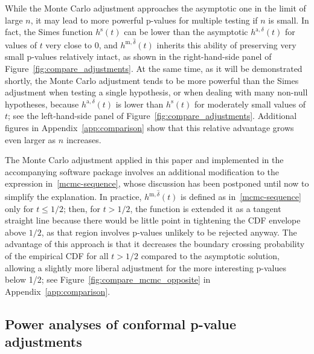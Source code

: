 \documentclass[11pt]{article}
\begin{document}
While the Monte Carlo adjustment approaches the asymptotic one in the limit of large $n$, it may lead to more powerful p-values for multiple testing if $n$ is small. In fact, the Simes function $h^{\mathrm{s}}(t)$ can be lower than the asymptotic $h^{\mathrm{a},\delta}(t)$ for values of $t$ very close to 0, and $h^{\mathrm{m},\hat{\delta}}(t)$ inherits this ability of preserving very small p-values relatively intact, as shown in the right-hand-side panel of Figure~\ref{fig:compare_adjustments}.
At the same time, as it will be demonstrated shortly, the Monte Carlo adjustment tends to be more powerful than the Simes adjustment when testing a single hypothesis, or when dealing with many non-null hypotheses, because $h^{\mathrm{a},\delta}(t)$ is lower than $h^{\mathrm{s}}(t)$ for moderately small values of $t$; see the left-hand-side panel of Figure~\ref{fig:compare_adjustments}. Additional figures in Appendix~\ref{app:comparison} show that this relative advantage grows even larger as $n$ increases.

The Monte Carlo adjustment applied in this paper and implemented in the accompanying software package involves an additional modification to the expression in~\eqref{mcmc-sequence}, whose discussion has been postponed until now to simplify the explanation. In practice, $h^{\mathrm{m},\hat{\delta}}(t)$ is defined as in~\eqref{mcmc-sequence} only for $t \leq 1/2$; then, for $t>1/2$, the function is extended it as a tangent straight line because there would be little point in tightening the CDF envelope above $1/2$, as that region involves p-values unlikely to be rejected anyway. The advantage of this approach is that it decreases the boundary crossing probability of the empirical CDF for all $t>1/2$ compared to the asymptotic solution, allowing a slightly more liberal adjustment for the more interesting p-values below 1/2; see Figure~\ref{fig:compare_mcmc_opposite} in Appendix~\ref{app:comparison}.


\subsection{Power analyses of conformal p-value adjustments} \label{sec:gen-power}
\end{document}
